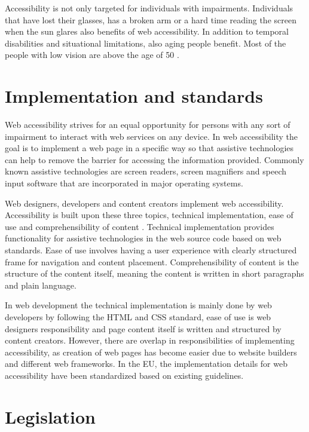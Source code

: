 Accessibility is not only targeted for individuals with impairments. Individuals that have lost their glasses, has a broken arm or a hard time reading the screen when the sun glares also benefits of web accessibility. In addition to temporal disabilities and situational limitations, also aging people benefit. Most of the people with low vision are above the age of 50 \citep{whovision}.


\section{Implementation and standards}

Web accessibility strives for an equal opportunity for persons with any sort of impairment to interact with web services on any device. In web accessibility the goal is to implement a web page in a specific way so that assistive technologies can help to remove the barrier for accessing the information provided. Commonly known assistive technologies are screen readers, screen magnifiers and speech input software that are incorporated in major operating systems.


Web designers, developers and content creators implement web accessibility. Accessibility is built upon these three topics, technical implementation, ease of use and comprehensibility of content \citep{webaccessibilitydefinition}. Technical implementation provides functionality for assistive technologies in the web source code based on web standards. Ease of use involves having a user experience with clearly structured frame for navigation and content placement. Comprehensibility of content is the structure of the content itself, meaning the content is written in short paragraphs and plain language. 

In web development the technical implementation is mainly done by web developers by following the HTML and CSS standard, ease of use is web designers responsibility and page content itself is written and structured by content creators. However, there are overlap in responsibilities of implementing accessibility, as creation of web pages has become easier due to website builders and different web frameworks. In the EU, the implementation details for web accessibility have been standardized based on existing guidelines.



\section{Legislation}

